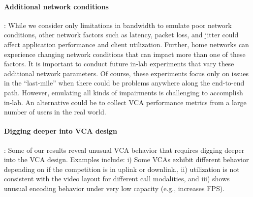 \paragraph{Additional network conditions}: While we consider only limitations in bandwidth to emulate poor network conditions, other network factors such as latency, packet loss, and jitter could affect application performance and client utilization. Further, home networks can experience changing network conditions that can impact more than one of these factors. It is important to conduct future in-lab experiments that vary these additional network parameters. Of course, these experiments focus only on issues in the ``last-mile'' when there could be problems anywhere along the end-to-end path. However, emulating all kinds of impairments is challenging to accomplish in-lab. An alternative could be to collect VCA performance metrics from a large number of users in the real world. 

\paragraph{Digging deeper into VCA design}: Some of our results reveal unusual VCA behavior that requires digging deeper into the VCA design. Examples include: i) Some VCAs exhibit different behavior depending on if the competition is in uplink or downlink., ii) \teams utilization is not consistent with the video layout for different call modalities, and iii) \meet shows unusual encoding behavior under very low capacity (e.g., increases FPS).
